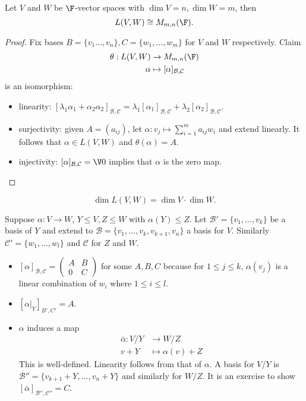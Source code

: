 \documentclass[a4paper]{article}
\newcommand*{\basis}{\mathcal}
\theoremstyle{definition}
\begin{document}
\begin{proposition}
  Let \(V\) and \(W\) be \(\F\)-vector spaces with \(\dim V = n, \dim W = m\), then
  \[
L(V,W) \cong M_{m,n}(\F).
  \]
\end{proposition}

\begin{proof}
  Fix bases \(B=\{v_1\ldots,v_n\}, C=\{w_1,\ldots,w_m\}\) for \(V\) and \(W\) respectively. Claim
  \begin{align*}
    \theta: L(V,W) &\to M_{m,n}(\F) \\
    \alpha &\mapsto [\alpha]_{\basis B, \basis C}
  \end{align*}
  is an isomorphism:
  \begin{itemize}
  \item linearity: \([\lambda_1\alpha_1+\alpha_2\alpha_2]_{\basis B, \basis C} = \lambda_1[\alpha_1]_{\basis B, \basis C} + \lambda_2[\alpha_2]_{\basis B, \basis C}\).
  \item surjectivity: given \(A = (a_{ij})\), let \(\alpha:v_j\mapsto \sum_{i=1}^{m}a_{ij}w_i \) and extend linearly. It follows that \(\alpha\in L(V,W)\) and \(\theta(\alpha) = A\).
  \item injectivity: \([\alpha]_{\basis B, \basis C} = \V 0\) implies that \(\alpha\) is the zero map.
  \end{itemize}
\end{proof}

\begin{corollary}
  \label{cor:dim of hom}
  \[
\dim L(V,W) = \dim V \cdot \dim W.
  \]
\end{corollary}

\begin{eg}
  Suppose \(\alpha:V\to W\), \(Y\leq V, Z\leq W\) with \(\alpha(Y)\leq Z\). Let \(\basis B'=\{v_1,\ldots,v_k\}\) be a basis of \(Y\) and extend to \(\basis B=\{v_1,\ldots,v_k,v_{k+1},v_n\}\) a basis for \(V\). Similarly \(\basis C' = \{w_1,\dots,w_l\}\) and \(\basis C\) for \(Z\) and \(W\).
  \begin{itemize}
  \item \([\alpha]_{\basis B, \basis C} =
\begin{pmatrix}
  A & B \\
  0 & C
\end{pmatrix}
\) for some \(A, B, C\) because for \(1\leq j \leq k\), \(\alpha(v_j)\) is a linear combination of \(w_i\) where \(1\leq i \leq l\).
  \item \([\alpha|_Y]_{B',C'} = A. \)
  \item \(\alpha\) induces a map
    \begin{align*}
      \bar\alpha: V/Y &\to W/Z \\
      v+ Y &\mapsto \alpha(v) + Z
    \end{align*}
    This is well-defined. Linearity follows from that of \(\alpha\). A basis for \(V/Y\) is \(\basis B''=\{v_{k+1}+Y,\ldots,v_n+Y\}\) and similarly for \(W/Z\). It is an exercise to show \([\bar\alpha]_{\basis B'', \basis C''} = C \).
  \end{itemize}
\end{eg}
\end{document}
